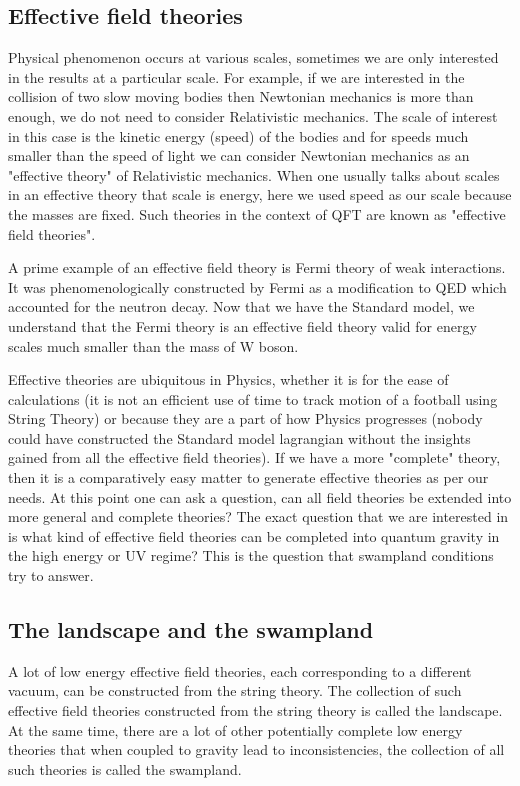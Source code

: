 \subsection{Effective field theories}
Physical phenomenon occurs at various scales, sometimes we are only interested in the results at a particular scale. For example, if we are interested in the collision of two slow moving bodies then Newtonian mechanics is more than enough, we do not need to consider Relativistic mechanics. The scale of interest in this case is the kinetic energy (speed) of the bodies and for speeds much smaller than the speed of light we can consider Newtonian mechanics as an "effective theory" of Relativistic mechanics. When one usually talks about scales in an effective theory that scale is energy, here we used speed as our scale because the masses are fixed. Such theories in the context of QFT are known as "effective field theories".



A prime example of an effective field theory is Fermi theory of weak interactions. It was phenomenologically constructed by Fermi as a modification to QED which accounted for the neutron decay. Now that we have the Standard model, we understand that the Fermi theory is an effective field theory valid for energy scales much smaller than the mass of W boson.

Effective theories are ubiquitous in Physics, whether it is for the ease of calculations (it is not an efficient use of time to track motion of a football using String Theory) or because they are a part of how Physics progresses (nobody could have constructed the Standard model lagrangian without the insights gained from all the effective field theories).
If we have a more "complete" theory, then it is a comparatively easy matter to generate effective theories as per our needs. At this point one can ask a question, can all field theories be extended into more general and complete theories?
The exact question that we are interested in is what kind of effective field theories can be completed into quantum gravity in the high energy or UV regime? This is the question that swampland conditions try to answer.


\subsection{The landscape and the swampland}
A lot of low energy effective field theories, each corresponding to a different vacuum, can be constructed from the string theory. The collection of such effective field theories constructed from the string theory is called the landscape. At the same time, there are a lot of other potentially complete low energy theories that when coupled to gravity lead to inconsistencies, the collection of all such theories is called the swampland.


